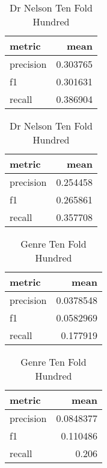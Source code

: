 \documentclass[letterpaper,10pt]{article}
\begin{document}
\begin{table}[H]
\centering
\setlength\tabcolsep{4pt}
\begin{minipage}{0.48\textwidth}
\centering
\begin{tabular}{lr}
\hline
 metric    &     mean \\
\hline
 precision & 0.303765 \\
 f1        & 0.301631 \\
 recall    & 0.386904 \\
\hline
\end{tabular}
\caption{Dr Nelson Ten Fold All}
\label{tab:10falldr} 
\end{minipage}%
\hfill
\begin{minipage}{0.48\textwidth}
\centering
\begin{tabular}{lr}
\hline
 metric    &     mean \\
\hline
 precision & 0.254458 \\
 f1        & 0.265861 \\
 recall    & 0.357708 \\
\hline
\end{tabular}
 \caption{Dr Nelson Ten Fold Hundred} 
 \label{tab:10f100dr} 
\end{minipage}
\end{table}

\begin{table}[H]
\centering
\setlength\tabcolsep{4pt}
\begin{minipage}{0.48\textwidth}
\centering
\begin{tabular}{lr}
\hline
 metric    &      mean \\
\hline
 precision & 0.0378548 \\
 f1        & 0.0582969 \\
 recall    & 0.177919  \\
\hline
\end{tabular}
\caption{Genre Ten Fold All}
\label{tab:10fallg} 
\end{minipage}%
\hfill
\begin{minipage}{0.48\textwidth}
\begin{tabular}{lr}
\hline
 metric    &      mean \\
\hline
 precision & 0.0848377 \\
 f1        & 0.110486  \\
 recall    & 0.206     \\
\hline
\end{tabular}
 \caption{Genre Ten Fold Hundred} 
 \label{tab:10f100g} 
\end{minipage}
\end{table}
\end{document}
